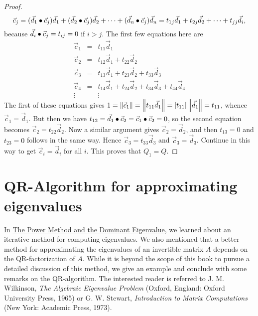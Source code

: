 \documentclass{ximera}
\begin{document}
\begin{proof}
\begin{equation*}
\vec{c}_{j} = (\vec{d}_{1} \bullet \vec{c}_{j})\vec{d}_{1} + (\vec{d}_{2} \bullet \vec{c}_{j})\vec{d}_{2} + \dots + (\vec{d}_{n} \bullet \vec{c}_{j})\vec{d}_{n} = t_{1j}\vec{d}_{1} + t_{2j}\vec{d}_{2} + \dots + t_{jj}\vec{d}_{i},
\end{equation*}
because $\vec{d}_{i} \bullet \vec{c}_{j} = t_{ij} = 0$ if $i > j$. The first few equations here are
\begin{equation*}
\begin{array}{ccl}
\vec{c}_{1} &=& t_{11}\vec{d}_{1} \\
\vec{c}_{2} &=& t_{12}\vec{d}_{1} + t_{22}\vec{d}_{2} \\
\vec{c}_{3} &=& t_{13}\vec{d}_{1} + t_{23}\vec{d}_{2} + t_{33}\vec{d}_{3} \\
\vec{c}_{4} &=& t_{14}\vec{d}_{1} + t_{24}\vec{d}_{2} + t_{34}\vec{d}_{3} + t_{44}\vec{d}_{4} \\
\vdots && \vdots
\end{array}
\end{equation*}
The first of these equations gives $1 = \left\| \vec{c}_{1} \right\| = \left\| t_{11}\vec{d}_{1} \right\| = | t_{11} | \left\| \vec{d}_{1} \right\| = t_{11}$, whence $\vec{c}_{1} = \vec{d}_{1}$. But then we have $t_{12} = \vec{d}_{1} \bullet \vec{c}_{2} = \vec{c}_{1} \bullet \vec{c}_{2} = 0$, so the second equation becomes $\vec{c}_{2} = t_{22}\vec{d}_{2}$. Now a similar argument gives $\vec{c}_{2} = \vec{d}_{2}$, and then $t_{13} = 0$ and $t_{23} = 0$ follows in the same way. Hence $\vec{c}_{3} = t_{33}\vec{d}_{3}$ and $\vec{c}_{3} = \vec{d}_{3}$. Continue in this way to get $\vec{c}_{i} = \vec{d}_{i}$ for all $i$. This proves that $Q_{1} = Q$.
\end{proof}

    
\section*{QR-Algorithm for approximating eigenvalues}\label{sec:QRalgorithm}
    
In \href{}{The Power Method and the Dominant Eigenvalue}, we learned about an iterative method for computing eigenvalues.  We also mentioned that a better method for approximating the eigenvalues of an invertible matrix $A$ depends on the QR-factorization of $A$.  While it is beyond the scope of this book to pursue a detailed discussion of this method, we give an example and conclude with some remarks on the QR-algorithm. The interested reader is referred to
    J. M. Wilkinson, \textit{The Algebraic Eigenvalue Problem} (Oxford, England: Oxford University Press, 1965) or G. W. Stewart, \textit{Introduction to Matrix Computations} (New York: Academic Press, 1973).
    
\end{document}
